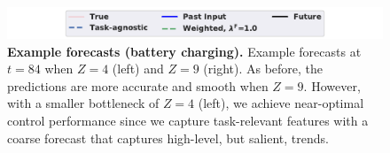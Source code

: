 \begin{figure}[ht]
\vskip 0.2in
\begin{center}

\includegraphics[width=0.8\columnwidth]{figures/forecast_legend_short.pdf}


\caption{\textbf{Example forecasts (battery charging).}  Example forecasts at $t=84$ when $Z=4$ (left) and $Z=9$ (right). As before, the predictions are more accurate and smooth when $Z=9$. However, with a smaller bottleneck of $Z=4$ (left), we achieve near-optimal control performance since we capture task-relevant features with a coarse forecast that captures high-level, but salient, trends.}
\label{fig:pjm_forecasts}
\end{center}
\vskip -0.2in
\end{figure}
